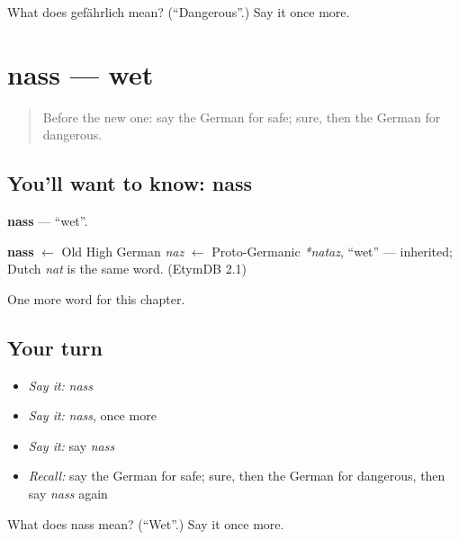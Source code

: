 \begin{tcolorbox}[breakable,colback=teal!4,colframe=teal!35!black,title={Before you move on}]
What does gefährlich mean? (\textquotedblleft{}Dangerous\textquotedblright{}.) Say it once more.
\end{tcolorbox}
\section[nass]{nass — wet}

\label{lesson:GE-C135-nass}



\begin{quote}
Before the new one: say the German for safe; sure, then the German for dangerous.
\end{quote}

\subsection*{You'll want to know: nass}
\textbf{nass} — \textquotedblleft{}wet\textquotedblright{}.

\begin{cousinweb}
\textbf{nass} $\leftarrow$ Old High German \emph{naz} $\leftarrow$ Proto-Germanic \emph{*nataz}, \textquotedblleft{}wet\textquotedblright{} — inherited; Dutch \emph{nat} is the same word. (EtymDB 2.1)
\end{cousinweb}

\begin{grammarlens}[title={What you've built}]
One more word for this chapter.
\end{grammarlens}

\subsection*{Your turn}
\begin{itemize}
\raggedright
  \item \emph{Say it:} \emph{nass}
  \item \emph{Say it:} \emph{nass}, once more
  \item \emph{Say it:} say \emph{nass}
  \item \emph{Recall:} say the German for safe; sure, then the German for dangerous, then say \emph{nass} again
\end{itemize}

\begin{tcolorbox}[breakable,colback=teal!4,colframe=teal!35!black,title={Before you move on}]
What does nass mean? (\textquotedblleft{}Wet\textquotedblright{}.) Say it once more.
\end{tcolorbox}

